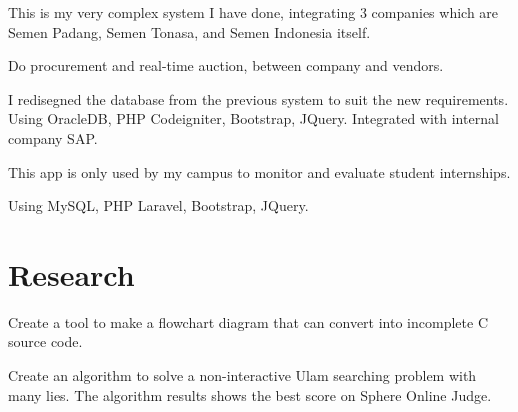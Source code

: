 \documentclass[letterpaper]{deedy-resume} %
\begin{document}
\begin{minipage}[t]{0.66\textwidth}
\begin{tightitemize}
\item This is my very complex system I have done, integrating 3 companies which are Semen Padang, Semen Tonasa, and Semen Indonesia itself.
\item Do procurement and real-time auction, between company and vendors.
\item I redisegned the database from the previous system to suit the new requirements. Using OracleDB, PHP Codeigniter, Bootstrap, JQuery. Integrated with internal company SAP.
\end{tightitemize}
\sectionspace

\begin{tightitemize}
\item This app is only used by my campus to monitor and evaluate student internships.
\item Using MySQL, PHP Laravel, Bootstrap, JQuery.
\end{tightitemize}
\sectionspace


\section{Research}

Create a tool to make a flowchart diagram that can convert into incomplete C source code.
\sectionspace

Create an algorithm to solve a non-interactive Ulam searching problem with many lies. The algorithm results shows the best score on Sphere Online Judge.
\sectionspace




\end{minipage}
\end{document}
